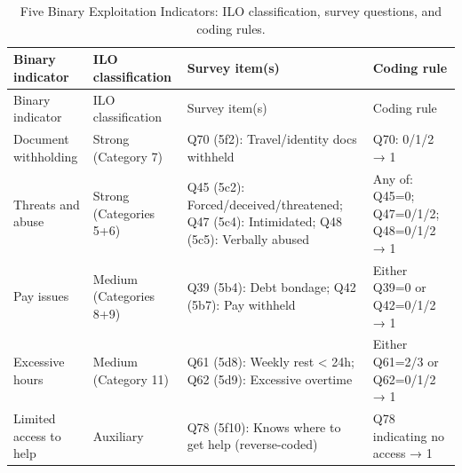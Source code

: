 \documentclass[
  12pt,
  letterpaper,
  DIV=11,
  numbers=noendperiod]{scrreprt}
\begin{document}
\begin{longtable}[]{@{}
  >{\raggedright\arraybackslash}p{}
  >{\raggedright\arraybackslash}p{}
  >{\raggedright\arraybackslash}p{}
  >{\raggedright\arraybackslash}p{}@{}}
\caption{Five Binary Exploitation Indicators: ILO classification, survey
questions, and coding rules.}\label{tbl-binary}\tabularnewline
\toprule\noalign{}
\begin{minipage}[b]{\linewidth}\raggedright
Binary indicator
\end{minipage} & \begin{minipage}[b]{\linewidth}\raggedright
ILO classification
\end{minipage} & \begin{minipage}[b]{\linewidth}\raggedright
Survey item(s)
\end{minipage} & \begin{minipage}[b]{\linewidth}\raggedright
Coding rule
\end{minipage} \\
\midrule\noalign{}
\endfirsthead
\toprule\noalign{}
\begin{minipage}[b]{\linewidth}\raggedright
Binary indicator
\end{minipage} & \begin{minipage}[b]{\linewidth}\raggedright
ILO classification
\end{minipage} & \begin{minipage}[b]{\linewidth}\raggedright
Survey item(s)
\end{minipage} & \begin{minipage}[b]{\linewidth}\raggedright
Coding rule
\end{minipage} \\
\midrule\noalign{}
\endhead
\bottomrule\noalign{}
\endlastfoot
Document withholding & Strong (Category 7) & Q70 (5f2): Travel/identity
docs withheld & Q70: 0/1/2 → 1 \\
Threats and abuse & Strong (Categories 5+6) & Q45 (5c2):
Forced/deceived/threatened; Q47 (5c4): Intimidated; Q48 (5c5): Verbally
abused & Any of: Q45=0; Q47=0/1/2; Q48=0/1/2 → 1 \\
Pay issues & Medium (Categories 8+9) & Q39 (5b4): Debt bondage; Q42
(5b7): Pay withheld & Either Q39=0 or Q42=0/1/2 → 1 \\
Excessive hours & Medium (Category 11) & Q61 (5d8): Weekly rest
\textless{} 24h; Q62 (5d9): Excessive overtime & Either Q61=2/3 or
Q62=0/1/2 → 1 \\
Limited access to help & Auxiliary & Q78 (5f10): Knows where to get help
(reverse-coded) & Q78 indicating no access → 1 \\
\end{longtable}
\end{document}
